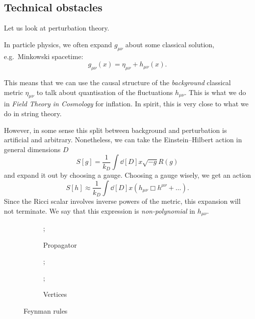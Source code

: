 \subsection*{Technical obstacles}%

Let us look at perturbation theory.

In particle physics, we often expand $g_{\mu\nu}$ about some classical solution, e.g.~Minkowski spacetime:
\begin{equation}
  g_{\mu\nu}(x) = \eta_{\mu\nu} + h_{\mu\nu}(x).
\end{equation}

This means that we can use the causal structure of the \emph{background} classical metric $\eta_{\mu\nu}$ to talk about quantisation of the fluctuations $h_{\mu\nu}$.
This is what we do in \emph{Field Theory in Cosmology} for inflation.
In spirit, this is very close to what we do in string theory.

However, in some sense this split between background and perturbation is artificial and arbitrary. Nonetheless, we can take the Einstein--Hilbert action in general dimensions $D$
\begin{equation}
  S[g] = \frac{1}{k_D} \int \dd[D]{x} \sqrt{-g} R(g)
\end{equation}
and expand it out by choosing a gauge.
Choosing a gauge wisely, we get an action
\begin{equation}
  S[h] \approx \frac{1}{k_D} \int \dd[D]{x} \left( h_{\mu\nu} \Box h^{\mu\nu} + \dots \right).
\end{equation}
Since the Ricci scalar involves inverse powers of the metric, this expansion will not terminate. We say that this expression is \emph{non-polynomial} in $h_{\mu\nu}$.

\begin{figure}[tbph]
  \centering
  \begin{subfigure}[t]{0.3\textwidth}
    \centering
    ;
    \caption{Propagator}
    \label{fig:l1f0p}
  \end{subfigure}%
  \begin{subfigure}[t]{0.3\textwidth}
    \centering
    \begin{minipage}[t]{0.3\textwidth}
      \centering
      ;
    \end{minipage}%
    \begin{minipage}[t]{0.3\textwidth}
      \centering
      ;
    \end{minipage}
    \caption{Vertices}
    \label{fig:l1f0v}
  \end{subfigure}
  \caption{Feynman rules}
  \label{fig:l1f0}
\end{figure}


